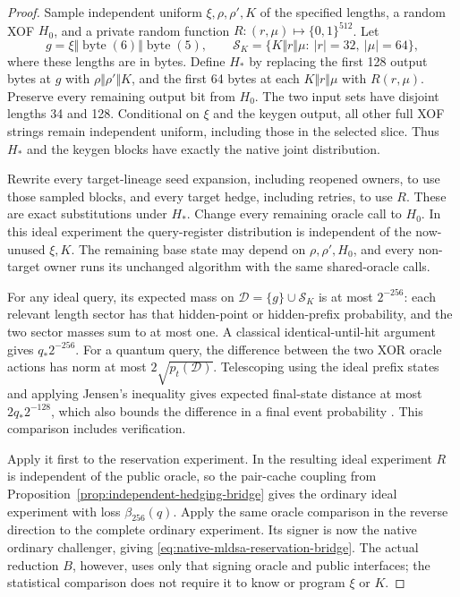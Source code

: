 \begin{proof}
Sample independent uniform $\xi,\rho,\rho',K$ of the specified lengths,
a random XOF $H_0$, and a private random function
$R:(r,\mu)\mapsto\{0,1\}^{512}$. Let
\[
 g=\xi\Vert\operatorname{byte}(6)\Vert\operatorname{byte}(5),\qquad
 \mathcal S_K=\{K\Vert r\Vert\mu:\ |r|=32,\ |\mu|=64\},
\]
where these lengths are in bytes. Define $H_*$ by replacing the first
128 output bytes at $g$ with $\rho\Vert\rho'\Vert K$, and the first
64 bytes at each $K\Vert r\Vert\mu$ with $R(r,\mu)$. Preserve every
remaining output bit from $H_0$. The two input sets have disjoint lengths
34 and 128. Conditional on $\xi$ and the keygen output, all other full XOF strings
remain independent uniform, including those in the selected slice.
Thus $H_*$ and the keygen blocks have exactly the native joint distribution.

Rewrite every target-lineage seed expansion, including reopened owners,
to use those sampled blocks, and every target hedge, including retries,
to use $R$. These are exact substitutions under $H_*$. Change every
remaining oracle call to $H_0$. In this ideal experiment the query-register
distribution is independent of the now-unused $\xi,K$. The remaining
base state may depend on $\rho,\rho',H_0$, and every non-target owner
runs its unchanged algorithm with the same shared-oracle calls.

For any ideal query, its expected mass on
$\mathcal D=\{g\}\cup\mathcal S_K$ is at most $2^{-256}$: each relevant
length sector has that hidden-point or hidden-prefix probability, and the
two sector masses sum to at most one. A classical identical-until-hit
argument gives $q_*2^{-256}$. For a quantum query, the difference between
the two XOR oracle actions has norm at most $2\sqrt{p_t(\mathcal D)}$.
Telescoping using the ideal prefix states and applying Jensen's inequality
gives expected final-state distance at most $2q_*2^{-128}$, which also
bounds the difference in a final event probability
\cite{bennett1997strengths}. This comparison includes verification.

Apply it first to the reservation experiment. In the resulting ideal
experiment $R$ is independent of the public oracle, so the pair-cache
coupling from Proposition~\ref{prop:independent-hedging-bridge} gives the
ordinary ideal experiment with loss $\beta_{256}(q)$. Apply the same
oracle comparison in the reverse direction to the complete ordinary
experiment. Its signer is now the native ordinary challenger, giving
\eqref{eq:native-mldsa-reservation-bridge}. The actual reduction $B$, however,
uses only that signing oracle and public interfaces; the statistical comparison
does not require it to know or program $\xi$ or $K$.
\end{proof}

